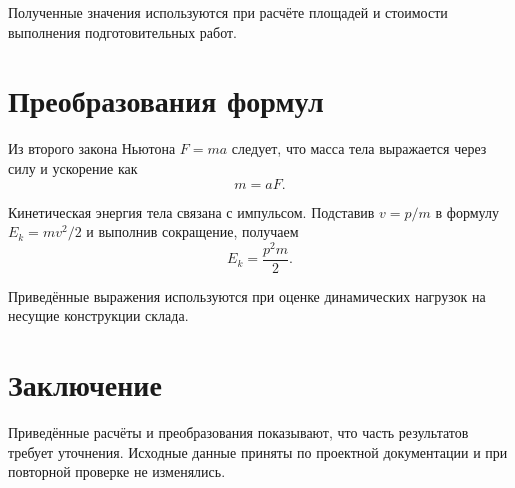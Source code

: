 Полученные значения используются при расчёте площадей
и стоимости выполнения подготовительных работ.
\chapter{Преобразования формул}

Из второго закона Ньютона $F = ma$ следует, что масса тела
выражается через силу и ускорение как
\[ m = aF. \]

Кинетическая энергия тела связана с импульсом. Подставив $v = p/m$
в формулу $E_k = mv^2/2$ и выполнив сокращение, получаем
\[ E_k = \frac{p^2 m}{2}. \]

Приведённые выражения используются при оценке динамических
нагрузок на несущие конструкции склада.
\chapter{Заключение}

Приведённые расчёты и преобразования показывают, что часть
результатов требует уточнения. Исходные данные приняты по проектной
документации и при повторной проверке не изменялись.
